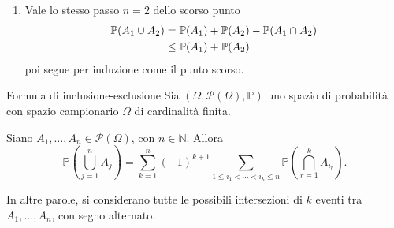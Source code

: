 \documentclass[a4paper]{article}
\begin{document}
\begin{snippetproof}{}
\begin{enumerate}
            \begin{align*}
                \mathbb P\left(\bigcup_{i=1}^{n+1} A_i\right)
                &= \mathbb P\left(\bigcup_{i=1}^{n+1} A_i\right) \\
                &= \mathbb P\left(\bigcup_{i=1}^{n} A_i\right) + \mathbb P(A_{n+1}) \\
                &= \sum_{i=1}^{n+1} \mathbb P(A_i)
            \end{align*}
        \item Vale lo stesso passo \(n=2\) dello scorso punto
            \begin{align*}
                \mathbb P(A_1 \cup A_2) &= \mathbb P(A_1) + \mathbb P(A_2) - \mathbb P(A_1 \cap A_2) \\
                &\leq \mathbb P(A_1) + \mathbb P(A_2)
            \end{align*}
            poi segue per induzione come il punto scorso.
    \end{enumerate}
\end{snippetproof}

\pagebreak

\begin{snippetproposition}{Formula di inclusione-esclusione}
    Sia \((\Omega, \mathcal{P}(\Omega), \mathbb{P})\)
    uno spazio di probabilità con spazio campionario \(\Omega\)
    di cardinalità finita.

    Siano \(A_1, \ldots, A_n \in \mathcal{P}(\Omega)\), con
    \(n \in \mathbb{N}\). Allora
    \[
        \mathbb{P}\left(
            \bigcup_{j=1}^{n} A_j
        \right)
        =
        \sum_{k=1}^{n}
        (-1)^{k+1}
        \sum_{1 \leq i_1 < \cdots < i_k \leq n}
        \mathbb{P}\left(
            \bigcap_{r=1}^{k} A_{i_r}
        \right).
    \]

    In altre parole, si considerano tutte le possibili intersezioni
    di \(k\) eventi tra \(A_1, \ldots, A_n\), con segno alternato.
\end{snippetproposition}
\end{document}

